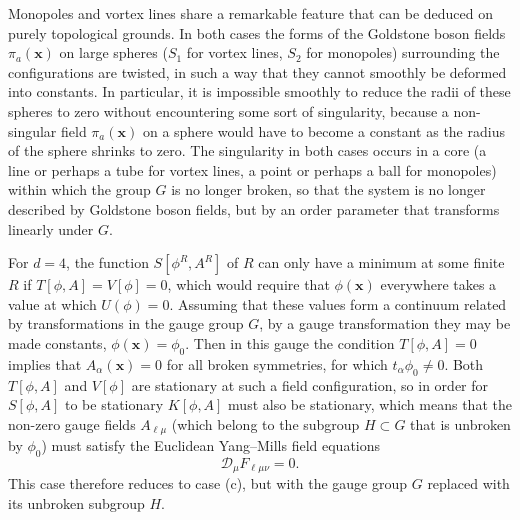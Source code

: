 Monopoles and vortex lines share a remarkable feature that can be deduced
on purely topological grounds. In both cases the forms of the Goldstone
boson fields $\pi_a(\mathbf{x})$ on large spheres ($S_1$ for vortex lines,
$S_2$ for monopoles) surrounding the configurations are twisted, in such a
way that they cannot smoothly be deformed into constants. In particular,
it is impossible smoothly to reduce the radii of these spheres to zero
without encountering some sort of singularity, because a non-singular field
$\pi_a(\mathbf{x})$ on a sphere would have to become a constant as the
radius of the sphere shrinks to zero. The singularity in both cases occurs
in a core (a line or perhaps a tube for vortex lines, a point or perhaps a
ball for monopoles) within which the group $G$ is no longer broken, so that
the system is no longer described by Goldstone boson fields, but by an
order parameter that transforms linearly under $G$.

For $d=4$, the function $S[\phi^R,A^R]$ of $R$ can only have a minimum at
some finite $R$ if $T[\phi,A]=V[\phi]=0$, which would require that
$\phi(\mathbf{x})$ everywhere takes a value at which $U(\phi)=0$. Assuming
that these values form a continuum related by transformations in the gauge
group $G$, by a gauge transformation they may be made constants,
$\phi(\mathbf{x})=\phi_0$. Then in this gauge the condition $T[\phi,A]=0$
implies that $A_\alpha(\mathbf{x})=0$ for all broken symmetries, for which
$t_\alpha\phi_0\ne0$. Both $T[\phi,A]$ and $V[\phi]$ are stationary at such
a field configuration, so in order for $S[\phi,A]$ to be stationary
$K[\phi,A]$ must also be stationary, which means that the non-zero gauge
fields $A_{\ell\mu}$ (which belong to the subgroup $H\subset G$ that is
unbroken by $\phi_0$) must satisfy the Euclidean Yang--Mills field equations
\begin{equation}
 \mathcal D_\mu F_{\ell\mu\nu}=0.
 \tag{23.1.10}\label{eq:23.1.10}
\end{equation}
This case therefore reduces to case (c), but with the gauge group $G$
replaced with its unbroken subgroup $H$.
